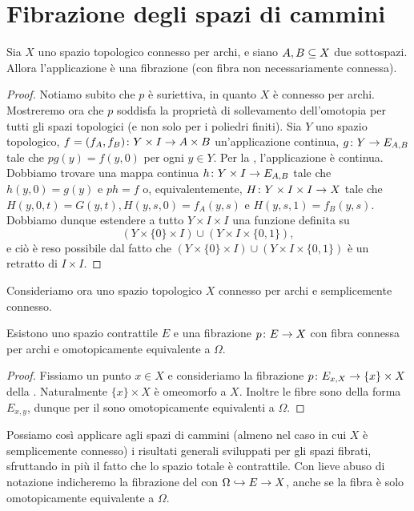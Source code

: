 \section{Fibrazione degli spazi di cammini}
\begin{proposition}
Sia $X$ uno spazio topologico connesso per archi, e siano $A,B\subseteq X$ due sottospazi. Allora l'applicazione
è una fibrazione (con fibra non necessariamente connessa).
\end{proposition}
\begin{proof}
Notiamo subito che $p$ è suriettiva, in quanto $X$ è connesso per archi. Mostreremo ora che $p$ soddisfa la proprietà di sollevamento dell'omotopia per tutti gli spazi topologici (e non solo per i poliedri finiti). Sia $Y$ uno spazio topologico, $f=(f_A,f_B)\colon Y\times I\to A\times B$ un'applicazione continua, $g\colon Y\to E_{A,B}$ tale che $pg(y)=f(y,0)$ per ogni $y\in Y$. Per la , l'applicazione
è continua. Dobbiamo trovare una mappa continua $h\colon Y\times I\to E_{A,B}$ tale che $h(y,0)=g(y)$ e $ph=f$ o, equivalentemente, $H\colon Y\times I\times I\to X$ tale che $H(y,0,t)=G(y,t),H(y,s,0)=f_A(y,s)$ e $H(y,s,1)=f_B(y,s)$. Dobbiamo dunque estendere a tutto $Y\times I\times I$ una funzione definita su
$$
(Y\times\{0\}\times I)\cup(Y\times I\times \{0,1\}),
$$
e ciò è reso possibile dal fatto che $(Y\times\{0\}\times I)\cup(Y\times I\times \{0,1\})$ è un retratto di $I\times I$.
\end{proof}

Consideriamo ora uno spazio topologico $X$ connesso per archi e semplicemente connesso.

\begin{corollary}
Esistono uno spazio contrattile $E$ e una fibrazione $p\colon E\to X$ con fibra connessa per archi e omotopicamente equivalente a $\Omega$.
\end{corollary}
\begin{proof}
Fissiamo un punto $x\in X$ e consideriamo la fibrazione $p\colon E_{x,X}\to\{x\}\times X$ della . Naturalmente $\{x\}\times X$ è omeomorfo a $X$. Inoltre le fibre sono della forma $E_{x,y}$, dunque per il  sono omotopicamente equivalenti a $\Omega$.
\end{proof}

Possiamo così applicare agli spazi di cammini (almeno nel caso in cui $X$ è semplicemente connesso) i risultati generali sviluppati per gli spazi fibrati, sfruttando in più il fatto che lo spazio totale è contrattile. Con lieve abuso di notazione indicheremo la fibrazione del  con $\Omega\hookrightarrow E\to X$, anche se la fibra è solo omotopicamente equivalente a $\Omega$.


